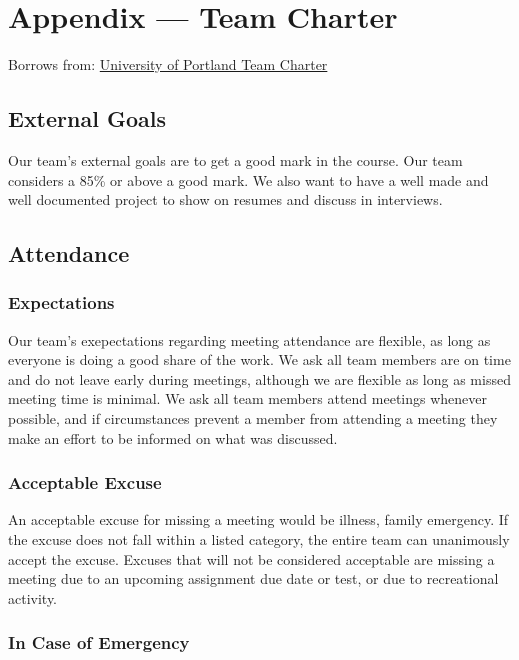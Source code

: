 \documentclass{article}
\begin{document}
\newpage{}

\section*{Appendix --- Team Charter}

Borrows from:
\href{https://engineering.up.edu/industry_partnerships/files/team-charter.pdf}
{University of Portland Team Charter}

\subsection*{External Goals}

Our team's external goals are to get a good mark in the course. Our team
considers a 85\% or above a good mark. We also want to have a well made and
well documented project to show on resumes and discuss in interviews.

\subsection*{Attendance}

\subsubsection*{Expectations}

Our team's exepectations regarding meeting attendance are flexible, as long as everyone is doing
a good share of the work. We ask all team members are on time and do not leave early during
meetings, although we are flexible as long as missed meeting time is minimal. We ask all team 
members attend meetings whenever possible, and if circumstances prevent a member from attending
a meeting they make an effort to be informed on what was discussed.

\subsubsection*{Acceptable Excuse}

An acceptable excuse for missing a meeting would be illness, family emergency. If the excuse does not fall within a listed category,
the entire team can unanimously accept the excuse. Excuses that will not be considered acceptable
are missing a meeting due to an upcoming assignment due date or test, or due to recreational
activity.

\subsubsection*{In Case of Emergency}
\end{document}
